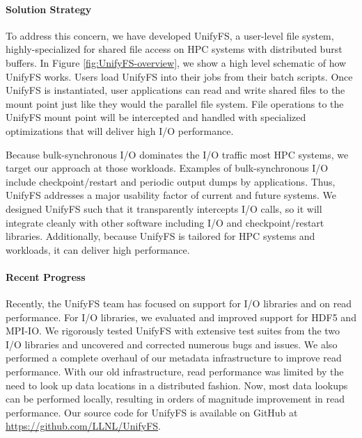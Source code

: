 \paragraph{Solution Strategy}

To address this concern, we have developed UnifyFS, a user-level file system,
highly-specialized for shared file access on HPC systems with distributed
burst buffers. In Figure \ref{fig:UnifyFS-overview}, we show a high
level schematic of how UnifyFS works. Users load UnifyFS into
their jobs from their batch scripts. Once UnifyFS is instantiated, user
applications can read and write shared files to the mount point just like
they would the parallel file system. File operations to the UnifyFS
mount point will be intercepted and handled with specialized optimizations
that will deliver high I/O performance. 

Because bulk-synchronous I/O dominates the 
I/O traffic most HPC systems, we target our approach at
those workloads. Examples of bulk-synchronous I/O include checkpoint/restart
and periodic output dumps by applications. Thus, UnifyFS  addresses a major usability
factor of current and future systems. We designed UnifyFS such
that it transparently intercepts I/O calls, so it will integrate
cleanly with other software including I/O and checkpoint/restart libraries.
Additionally, because UnifyFS is tailored for HPC systems and workloads,
it can deliver high performance.



\paragraph{Recent Progress}

Recently, the UnifyFS team has focused on support for I/O libraries and on read performance. 
For I/O libraries, we evaluated and improved support for HDF5 and MPI-IO. We rigorously 
tested UnifyFS with extensive test suites from the two I/O libraries and uncovered and
corrected numerous bugs and issues. We also performed a complete overhaul of our metadata
infrastructure to improve read performance. With our old infrastructure, read performance
was limited by the need to look up data locations in a distributed fashion. Now, most
data lookups can be performed locally, resulting in orders of magnitude improvement
in read performance.
Our source code for UnifyFS is available on 
GitHub at \url{https://github.com/LLNL/UnifyFS}. 
%

